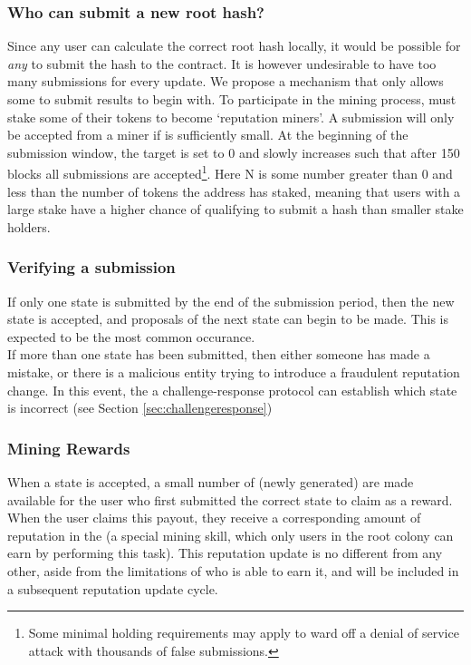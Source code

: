 \subsubsection*{Who can submit a new root hash?}
Since any user can calculate the correct root hash locally, it would be possible for \emph{any} \rcth to submit the hash to the contract.
It is however undesirable to have too many submissions for every update. We propose a mechanism that only allows some \rcths to submit results to begin with. To participate in the mining process, \rcths must stake some of their tokens to become `reputation miners'. A submission will only be accepted from a miner if  is sufficiently small.  At the beginning of the submission window, the target is set to 0 and slowly increases such that after 150 blocks all submissions are accepted\footnote{Some minimal \rct holding requirements may apply to ward off a denial of service attack with thousands of false submissions.}. Here N is some number greater than 0 and less than the number of tokens the \rcth address has staked, meaning that users with a large stake have a higher chance of qualifying to submit a hash than smaller stake holders.
%
\subsubsection*{Verifying a submission}
If only one state is submitted by the end of the submission period, then the new state is accepted, and proposals of the next state can begin to be made. This is expected to be the most common occurance.\\
If more than one state has been submitted, then either someone has made a mistake, or there is a malicious entity trying to introduce a fraudulent reputation change. In this event, the a challenge-response protocol can establish which state is incorrect (see Section \ref{sec:challengeresponse})

\subsubsection*{Mining Rewards}

When a state is accepted, a small number of (newly generated) \rcts are made available for the user who first submitted the correct state to claim as a reward. When the user claims this payout, they receive a corresponding amount of reputation in the \rc (a special mining skill, which only users in the root colony can earn by performing this task). This reputation update is no different from any other, aside from the limitations of who is able to earn it, and will be included in a subsequent reputation update cycle.

